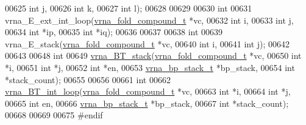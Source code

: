 \begin{DoxyCode}
00625                          \textcolor{keywordtype}{int}                  j,
00626                          \textcolor{keywordtype}{int}                  k,
00627                          \textcolor{keywordtype}{int}                  l);
00628 
00629 
00630 \textcolor{keywordtype}{int}
00631 vrna\_E\_ext\_int\_loop(\hyperlink{group__fold__compound_structvrna__fc__s}{vrna\_fold\_compound\_t}  *vc,
00632                     \textcolor{keywordtype}{int}                   i,
00633                     \textcolor{keywordtype}{int}                   j,
00634                     \textcolor{keywordtype}{int}                   *ip,
00635                     \textcolor{keywordtype}{int}                   *iq);
00636 
00637 
00638 \textcolor{keywordtype}{int}
00639 vrna\_E\_stack(\hyperlink{group__fold__compound_structvrna__fc__s}{vrna\_fold\_compound\_t} *vc,
00640              \textcolor{keywordtype}{int}                  i,
00641              \textcolor{keywordtype}{int}                  j);
00642 
00643 
00648 \textcolor{keywordtype}{int}
00649 \hyperlink{group__loops_gad320d5d721e33bed120168213d8f45e5}{vrna\_BT\_stack}(\hyperlink{group__fold__compound_structvrna__fc__s}{vrna\_fold\_compound\_t}  *vc,
00650               \textcolor{keywordtype}{int}                   *i,
00651               \textcolor{keywordtype}{int}                   *j,
00652               \textcolor{keywordtype}{int}                   *en,
00653               \hyperlink{group__data__structures_structvrna__bp__stack__s}{vrna\_bp\_stack\_t}       *bp\_stack,
00654               \textcolor{keywordtype}{int}                   *stack\_count);
00655 
00656 
00661 \textcolor{keywordtype}{int}
00662 \hyperlink{group__loops_ga849b7dc373b6c0b029672e16a7e52053}{vrna\_BT\_int\_loop}(\hyperlink{group__fold__compound_structvrna__fc__s}{vrna\_fold\_compound\_t} *vc,
00663                  \textcolor{keywordtype}{int}                  *i,
00664                  \textcolor{keywordtype}{int}                  *j,
00665                  \textcolor{keywordtype}{int}                  en,
00666                  \hyperlink{group__data__structures_structvrna__bp__stack__s}{vrna\_bp\_stack\_t}      *bp\_stack,
00667                  \textcolor{keywordtype}{int}                  *stack\_count);
00668 
00669 
00675 \textcolor{preprocessor}{#endif}
\end{DoxyCode}
